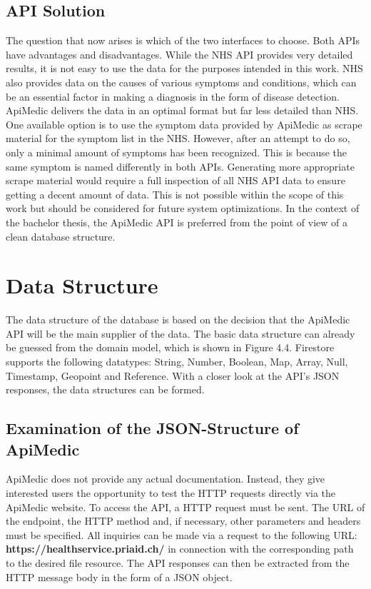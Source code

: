 \subsection{API Solution}
The question that now arises is which of the two interfaces to choose. Both APIs have advantages and disadvantages. While the NHS API provides very detailed results, it is not easy to use the data for the purposes intended in this work. NHS also provides data on the causes of various symptoms and conditions, which can be an essential factor in making a diagnosis in the form of disease detection. ApiMedic delivers the data in an optimal format but far less detailed than NHS. One available option is to use the symptom data provided by ApiMedic as scrape material for the symptom list in the NHS. However, after an attempt to do so, only a minimal amount of symptoms has been recognized. This is because the same symptom is named differently in both APIs. Generating more appropriate scrape material would require a full inspection of all NHS API data to ensure getting a decent amount of data. This is not possible within the scope of this work but should be considered for future system optimizations. In the context of the bachelor thesis, the ApiMedic API is preferred from the point of view of a clean database structure.

\section{Data Structure}
The data structure of the database is based on the decision that the ApiMedic API will be the main supplier of the data. The basic data structure can already be guessed from the domain model, which is shown in Figure 4.4. Firestore supports the following datatypes: String, Number, Boolean, Map, Array, Null, Timestamp, Geopoint and Reference. With a closer look at the API's JSON responses, the data structures can be formed.

\subsection{Examination of the JSON-Structure of ApiMedic}
ApiMedic does not provide any actual documentation. Instead, they give interested users the opportunity to test the HTTP requests directly via the ApiMedic website. To access the API, a HTTP request must be sent. The URL of the endpoint, the HTTP method and, if necessary, other parameters and headers must be specified. All inquiries can be made via a request to the following URL: \textbf{https://healthservice.priaid.ch/} in connection with the corresponding path to the desired file resource. The API responses can then be extracted from the HTTP message body in the form of a JSON object.

